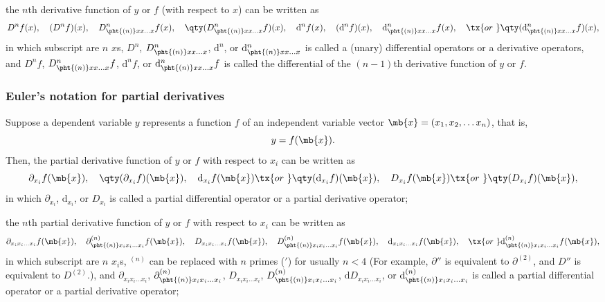 the $n$th derivative function of $y$ or $f$ (with respect to $x$) can be written as
\[D^nf(x),\quad(D^nf)(x),\quad D^n_{\pht{(n)}xx\dots x}f(x),\quad\qty(D^n_{\pht{(n)}xx\dots x}f)(x),\quad \mathrm{d}^nf(x),\quad(\mathrm{d}^nf)(x),\quad \mathrm{d}^n_{\pht{(n)}xx\dots x}f(x),\quad \tx{or\ }\qty(\mathrm{d}^n_{\pht{(n)}xx\dots x}f)(x),\]
in which subscript are $n$ $x$s, $D^n$, $D^n_{\pht{(n)}xx\dots x}$, $\mathrm{d}^n$, or $\mathrm{d}^n_{\pht{(n)}xx\dots x}$ is called a (unary) differential operators or a derivative operators, and $D^nf$, $D^n_{\pht{(n)}xx\dots x}f$, $\mathrm{d}^nf$, or $\mathrm{d}^n_{\pht{(n)}xx\dots x}f$ is called the differential of the $(n-1)$th derivative function of $y$ or $f$.
\subsubsection{Euler's notation for partial derivatives}
Suppose a dependent variable $y$ represents a function $f$ of an independent variable vector $\mb{x}=(x_1,x_2,\dots x_n)$, that is,
\[y=f(\mb{x}).\]
Then, the partial derivative function of $y$ or $f$ with respect to $x_i$ can be written as
\[\partial_{x_i}f(\mb{x}),\quad \qty(\partial_{x_i}f)(\mb{x}),\quad \mathrm{d}_{x_i}f(\mb{x})\tx{or\ }\qty(\mathrm{d}_{x_i}f)(\mb{x}),\quad D_{x_i}f(\mb{x})\tx{or\ }\qty(D_{x_i}f)(\mb{x}),\]
in which $\partial_{x_i}$, $\mathrm{d}_{x_i}$, or $D_{x_i}$ is called a partial differential operator or a partial derivative operator;

the $n$th partial derivative function of $y$ or $f$ with respect to $x_i$ can be written as
\[\partial_{x_ix_i\dots  x_i}f(\mb{x}),\quad\partial^{(n)}_{\pht{(n)}x_ix_i\dots  x_i}f(\mb{x}),\quad D_{x_ix_i\dots  x_i}f(\mb{x}),\quad D^{(n)}_{\pht{(n)}x_ix_i\dots  x_i}f(\mb{x}),\quad \mathrm{d}_{x_ix_i\dots  x_i}f(\mb{x}),\quad\tx{or\ }\mathrm{d}^{(n)}_{\pht{(n)}x_ix_i\dots  x_i}f(\mb{x}),\]
in which subscript are $n$ $x_i$s, $^{(n)}$ can be replaced with $n$ primes ($'$) for usually $n<4$ (For example, $\partial''$ is equivalent to $\partial^{(2)}$, and $D''$ is equivalent to $D^{(2)}$.), and $\partial_{x_ix_i\dots  x_i}$, $\partial^{(n)}_{\pht{(n)}x_ix_i\dots  x_i}$, $D_{x_ix_i\dots  x_i}$, $D^{(n)}_{\pht{(n)}x_ix_i\dots  x_i}$, $\mathrm{d}D_{x_ix_i\dots  x_i}$, or $\mathrm{d}^{(n)}_{\pht{(n)}x_ix_i\dots  x_i}$ is called a partial differential operator or a partial derivative operator;

